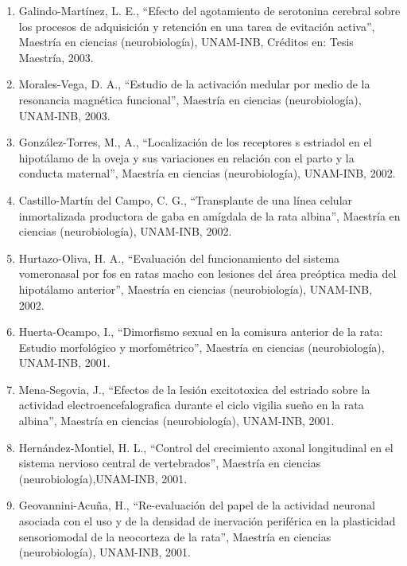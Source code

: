 \begin{enumerate}
\item Galindo-Martínez, L. E., “Efecto del agotamiento de serotonina cerebral sobre los procesos de adquisición y retención 
en una tarea de evitación activa”, Maestría en ciencias (neurobiología), UNAM-INB, Créditos en: Tesis Maestría, 2003.

\item Morales-Vega, D. A., “Estudio de la activación medular por medio de la resonancia magnética funcional”, Maestría en 
ciencias (neurobiología), UNAM-INB, 2003.

\item González-Torres, M., A., “Localización de los receptores s estriadol en el hipotálamo de la oveja y sus variaciones 
en 
relación con el parto y la conducta maternal”, Maestría en ciencias (neurobiología), UNAM-INB, 2002.

\item Castillo-Martín del Campo, C. G., “Transplante de una línea celular inmortalizada productora de gaba en amígdala de 
la 
rata albina”, Maestría en ciencias (neurobiología), UNAM-INB, 2002.

\item Hurtazo-Oliva, H. A., “Evaluación del funcionamiento del sistema vomeronasal por fos en ratas macho con lesiones del 
área preóptica media del hipotálamo anterior”, Maestría en ciencias (neurobiología), UNAM-INB, 2002.

\item Huerta-Ocampo, I., “Dimorfismo sexual en la comisura anterior de la rata: Estudio morfológico y morfométrico”, 
Maestría 
en ciencias (neurobiología), UNAM-INB, 2001.

\item Mena-Segovia, J., “Efectos de la lesión excitotoxica del estriado sobre la actividad electroencefalografica durante 
el 
ciclo vigilia sueño en la rata albina”, Maestría en ciencias (neurobiología), UNAM-INB, 2001.

\item Hernández-Montiel, H. L., “Control del crecimiento axonal longitudinal en el sistema nervioso central de 
vertebrados”, 
Maestría en ciencias (neurobiología),UNAM-INB, 2001.

\item Geovannini-Acuña, H., “Re-evaluación del papel de la actividad neuronal asociada con el uso y de la densidad de 
inervación periférica en la plasticidad sensoriomodal de la neocorteza de la rata”, Maestría en ciencias (neurobiología), 
UNAM-INB, 2001.


\end{enumerate}
